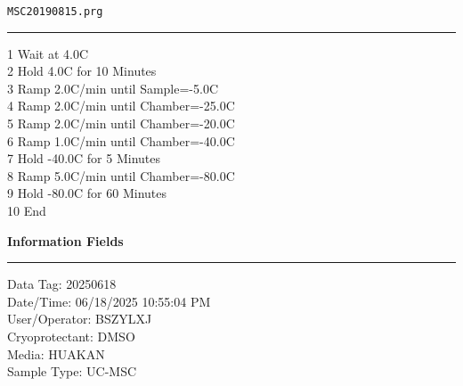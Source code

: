 \documentclass[UTF8,10pt,a4paper,fontset=fandol]{ctexart}
\newcommand{\fieldvalue}[1]{#1}
\begin{document}
\begin{center}
\end{center}

\vspace{2pt}

\noindent
\begin{minipage}[t]{0.43\linewidth}
\centering
\fieldvalue{\texttt{MSC20190815.prg}}

\vspace{3pt}
\hrule
\vspace{4pt}

\raggedright
1 Wait at 4.0\textdegree C\\
2 Hold 4.0\textdegree C for 10 Minutes\\
3 Ramp 2.0\textdegree C/min until Sample=-5.0\textdegree C\\
4 Ramp 2.0\textdegree C/min until Chamber=-25.0\textdegree C\\
5 Ramp 2.0\textdegree C/min until Chamber=-20.0\textdegree C\\
6 Ramp 1.0\textdegree C/min until Chamber=-40.0\textdegree C\\
7 Hold -40.0\textdegree C for 5 Minutes\\
8 Ramp 5.0\textdegree C/min until Chamber=-80.0\textdegree C\\
9 Hold -80.0\textdegree C for 60 Minutes\\
10 End
\end{minipage}
\hfill
\begin{minipage}[t]{0.43\linewidth}
\centering
\textbf{Information Fields}

\vspace{3pt}
\hrule
\vspace{4pt}

\raggedright
Data Tag: 
\fieldvalue{20250618}\\[2pt]
Date/Time: 
\fieldvalue{06/18/2025 10:55:04 PM}\\[2pt]
User/Operator: 
\fieldvalue{BSZYLXJ}\\[2pt]
Cryoprotectant: 
\fieldvalue{DMSO}\\[2pt]
Media: 
\fieldvalue{HUAKAN}\\[2pt]
Sample Type: 
\fieldvalue{UC-MSC}
\end{minipage}
\end{document}
